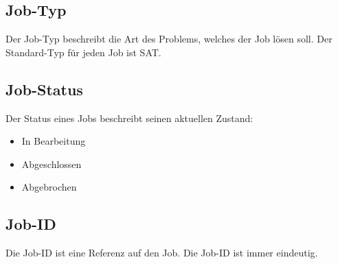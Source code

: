 \subsection{Job-Typ}
\label{B:Job-Typ}
Der Job-Typ beschreibt die Art des Problems, welches der Job lösen soll. Der Standard-Typ für jeden Job ist SAT.

\subsection{Job-Status}
\label{B:Job-Status}
Der Status eines Jobs beschreibt seinen aktuellen Zustand: 
\begin{itemize}[noitemsep]
    \item In Bearbeitung
    \item Abgeschlossen
    \item Abgebrochen
\end{itemize}

\subsection{Job-ID}
\label{B:Job-ID}
Die Job-ID ist eine Referenz auf den Job. Die Job-ID ist immer eindeutig.
